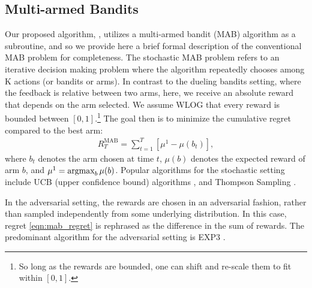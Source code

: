 
\subsection{Multi-armed Bandits}
Our proposed algorithm,
\selfsparring, utilizes a  multi-armed bandit (MAB) algorithm as a subroutine, and so we provide here a brief formal description of the conventional MAB problem for completeness.
The stochastic MAB problem \citep{robbins52} refers to an iterative decision making problem where the algorithm repeatedly chooses among K actions (or bandits or arms).  In contrast to the dueling bandits setting, where the feedback is relative between two arms, here, we receive an absolute reward that depends on the arm selected. We assume WLOG that every reward is bounded between $[0,1]$.\footnote{So long as the rewards are bounded, one can shift and re-scale them to fit within $[0,1]$.} The goal then is to minimize the cumulative regret compared to the best arm:
\begin{eqnarray}
R_T^{\text{MAB}} = \sum_{t=1}^T \left[\mu^1 - \mu(b_t)\right],
\label{eqn:mab_regret}
\end{eqnarray}
where $b_t$ denotes the arm chosen at time $t$, $\mu(b)$ denotes the expected reward of arm $b$, and $\mu^1 = \argmax_b \mu(b)$.
Popular algorithms for the stochastic setting include UCB (upper confidence bound) algorithms \citep{auer2002finite}, and Thompson Sampling
\citep{chapelle2011empirical,russo2014learning}.  

In the adversarial setting, the rewards are chosen in an adversarial fashion, rather than sampled independently from some underlying distribution.  In this case, regret \eqref{eqn:mab_regret} is rephrased as the difference in the sum of rewards. The predominant algorithm for the adversarial setting is EXP3 \citep{auer2002nonstochastic}.




